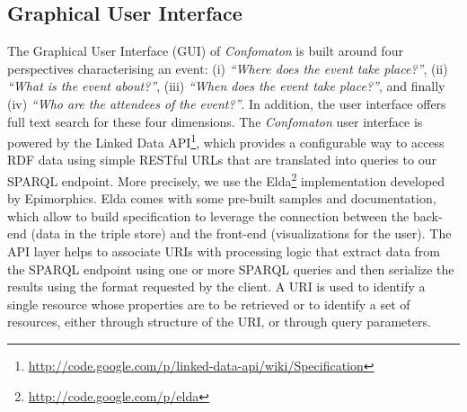 \subsection{Graphical User Interface}
The Graphical User Interface (GUI) of \emph{Confomaton} is built around four perspectives characterising an event: (i) \textit{``Where does the event take place?''}, (ii) \textit{``What is the event about?''}, (iii) \textit{``When does the event take place?''}, and finally (iv) \textit{``Who are the attendees of the event?''}. In addition, the user interface offers full text search for these four dimensions. The \emph{Confomaton} user interface is powered by the Linked Data API\footnote{\url{http://code.google.com/p/linked-data-api/wiki/Specification}}, which provides a configurable way to access RDF data using simple RESTful URLs that are translated into queries to our SPARQL endpoint. More precisely, we use the Elda\footnote{\url{http://code.google.com/p/elda}} implementation developed by Epimorphics. Elda comes with some pre-built samples and documentation, which allow to build specification to leverage the connection between the back-end (data in the triple store) and the front-end (visualizations for the user). The API layer helps to associate URIs with processing logic that extract data from the SPARQL endpoint using one or more SPARQL queries and then serialize the results using the format requested by the client. A URI is used to identify a single resource whose properties are to be retrieved or to identify a set of resources, either through structure of the URI, or through query parameters.


